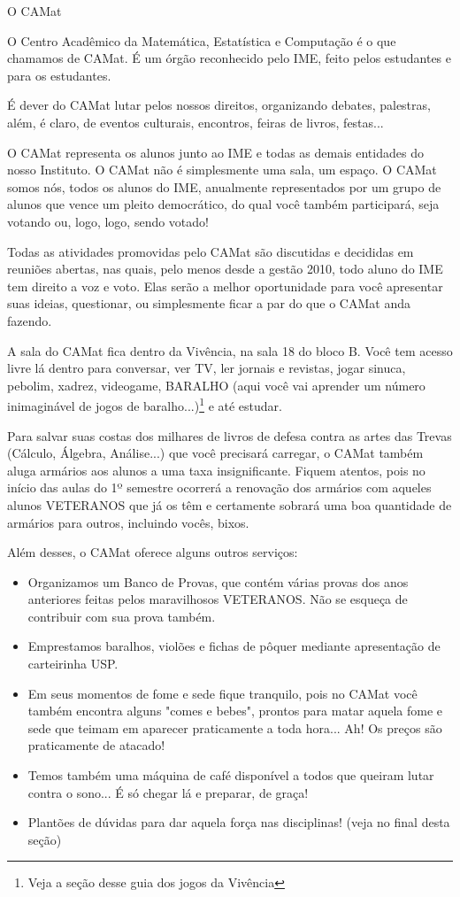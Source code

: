 \begin{secao}{O CAMat}

O Centro Acadêmico da Matemática, Estatística e Computação é o que chamamos de
CAMat. É um órgão reconhecido pelo IME, feito pelos estudantes e para os
estudantes.

É dever do CAMat lutar pelos nossos direitos, organizando debates, palestras,
além, é claro, de eventos culturais, encontros, feiras de livros, festas...

O CAMat representa os alunos junto ao IME e todas as demais entidades do nosso
Instituto. O CAMat não é simplesmente uma sala, um espaço. O CAMat somos nós,
todos os alunos do IME, anualmente representados por um grupo de alunos que
vence um pleito democrático, do qual você também participará, seja votando ou,
logo, logo, sendo votado!

Todas as atividades promovidas pelo CAMat são discutidas e decididas em
reuniões abertas, nas quais, pelo menos desde a gestão 2010, todo aluno do IME tem
direito a voz e voto. Elas serão a melhor oportunidade para você apresentar suas
ideias, questionar, ou simplesmente ficar a par do que o CAMat
anda fazendo.

A sala do CAMat  fica dentro da Vivência, na sala 18 do bloco B. Você tem acesso
livre lá dentro para conversar, ver TV, ler jornais e revistas, jogar sinuca,
pebolim, xadrez, videogame, BARALHO (aqui você vai aprender um número inimaginável de
jogos de baralho...)\footnote{Veja a seção desse guia dos jogos da
Vivência} e até estudar.

Para salvar suas costas dos milhares de livros de defesa contra as artes das
Trevas (Cálculo, Álgebra, Análise...) que você precisará carregar, o CAMat
também aluga armários aos alunos a uma taxa insignificante. Fiquem atentos, pois no
início das aulas do 1º semestre ocorrerá a renovação dos armários com
aqueles alunos VETERANOS que já os têm e certamente sobrará uma boa quantidade
de armários para outros, incluindo vocês, bixos.

Além desses, o CAMat oferece alguns outros serviços:

\begin{itemize}
  \item Organizamos um Banco de Provas, que contém várias provas dos anos
    anteriores feitas pelos maravilhosos VETERANOS. Não se esqueça de contribuir
    com sua prova também.
  \item Emprestamos baralhos, violões e fichas de pôquer mediante apresentação
    de carteirinha USP.
  \item Em seus momentos de fome e sede fique tranquilo, pois no CAMat você
    também encontra alguns "comes e bebes", prontos para matar aquela fome e
    sede que teimam em aparecer praticamente a toda hora... Ah! Os preços são
    praticamente de atacado!
  \item Temos também uma máquina de café disponível a todos que queiram lutar
    contra o sono... É só chegar lá e preparar, de graça!
  \item Plantões de dúvidas para dar aquela força nas disciplinas! (veja no
    final desta seção)
\end{itemize}


\end{secao}

